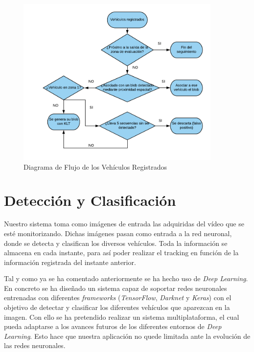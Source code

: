 \begin{figure}[H] 
\begin{center}
	\includegraphics[width=0.9\textwidth]{figures/Diseno_global/diagrama_flujo1.png}
   \caption{Diagrama de Flujo de  los Vehículos Registrados}
	\label{fig.diagrama_flujo_vehiculos}
\end{center}
\end{figure}

\section{Detección y Clasificación}

Nuestro sistema toma como imágenes de entrada las adquiridas del vídeo que se esté monitorizando. Dichas imágenes pasan como entrada a la red neuronal, donde se detecta y clasifican los diversos vehículos. Toda la información se almacena en cada instante, para así poder realizar el tracking en función de la información registrada del instante anterior.

Tal y como ya se ha comentado anteriormente se ha hecho uso de \textit{Deep Learning}. En concreto se ha diseñado un sistema capaz de soportar redes neuronales entrenadas con diferentes \textit{frameworks} (\textit{TensorFlow}, \textit{Darknet} y \textit{Keras}) con el objetivo de detectar y clasificar los diferentes vehículos que aparezcan en la imagen. Con ello se ha pretendido realizar un sistema multiplataforma, el cual pueda adaptarse a los avances futuros de los diferentes entornos de \textit{Deep Learning}. Esto hace que nuestra aplicación no quede limitada ante la evolución de las redes neuronales.

